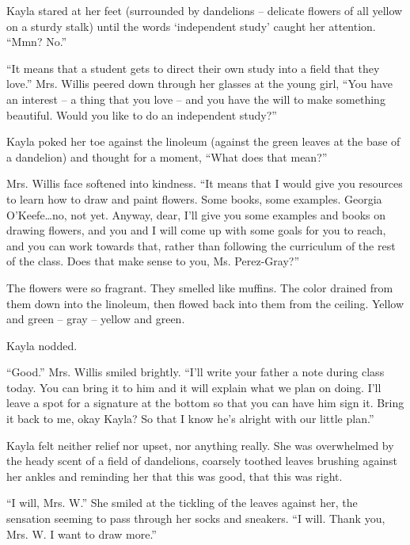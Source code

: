 Kayla stared at her feet (surrounded by dandelions -- delicate flowers of all yellow on a sturdy stalk) until the words `independent study' caught her attention.  ``Mmn?  No.''

``It means that a student gets to direct their own study into a field that they love.''  Mrs. Willis peered down through her glasses at the young girl, ``You have an interest -- a thing that you love -- and you have the will to make something beautiful.  Would you like to do an independent study?''

Kayla poked her toe against the linoleum (against the green leaves at the base of a dandelion) and thought for a moment, ``What does that mean?''

Mrs. Willis face softened into kindness.  ``It means that I would give you resources to learn how to draw and paint flowers.  Some books, some examples.  Georgia O'Keefe\ldots{}no, not yet.  Anyway, dear, I'll give you some examples and books on drawing flowers, and you and I will come up with some goals for you to reach, and you can work towards that, rather than following the curriculum of the rest of the class.  Does that make sense to you, Ms. Perez-Gray?''

The flowers were so fragrant.  They smelled like muffins.  The color drained from them down into the linoleum, then flowed back into them from the ceiling.  Yellow and green -- gray -- yellow and green.

Kayla nodded.

``Good.''  Mrs. Willis smiled brightly.  ``I'll write your father a note during class today.  You can bring it to him and it will explain what we plan on doing.  I'll leave a spot for a signature at the bottom so that you can have him sign it.  Bring it back to me, okay Kayla?  So that I know he's alright with our little plan.''

Kayla felt neither relief nor upset, nor anything really.  She was overwhelmed by the heady scent of a field of dandelions, coarsely toothed leaves brushing against her ankles and reminding her that this was good, that this was right.

``I will, Mrs. W.''  She smiled at the tickling of the leaves against her, the sensation seeming to pass through her socks and sneakers.  ``I will.  Thank you, Mrs. W.  I want to draw more.''

